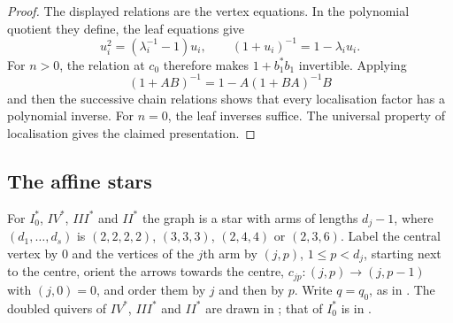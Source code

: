 \documentclass[a4paper]{amsart}
\numberwithin{equation}{section}
\begin{document}
\begin{proof}
The displayed relations are the vertex equations. In the polynomial
quotient they define, the leaf equations give
\[
 u_i^2=(\lambda_i^{-1}-1)u_i,
 \qquad (1+u_i)^{-1}=1-\lambda_i u_i.
\]
For $n>0$, the relation at $c_0$ therefore makes $1+b_1^*b_1$
invertible. Applying
\[
 (1+AB)^{-1}=1-A(1+BA)^{-1}B
\]
and then the successive chain relations shows that every localisation
factor has a polynomial inverse. For $n=0$, the leaf inverses suffice.
The universal property of localisation gives the claimed presentation.
\end{proof}

\subsection{The affine stars}
\label{subsec:stars}

For $I_0^*$, $IV^*$, $III^*$ and $II^*$ the graph is a star with
arms of lengths $d_j-1$, where $(d_1,\ldots,d_s)$ is $(2,2,2,2)$,
$(3,3,3)$, $(2,4,4)$ or $(2,3,6)$. Label the central vertex by $0$ and
the vertices of the $j$th arm by $(j,p)$, $1\le p<d_j$, starting next to
the centre, orient the arrows towards the centre,
$c_{jp}:(j,p)\to(j,p-1)$ with $(j,0)=0$, and order them by $j$ and
then by $p$. Write $q=q_0$, as in
. The doubled quivers of $IV^*$, $III^*$ and
$II^*$ are drawn in ; that of $I_0^*$ is in
.
\end{document}
